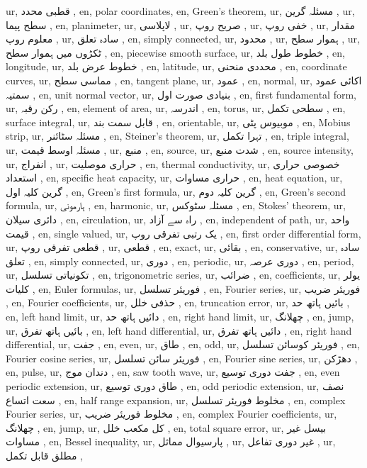 ur, قطبی محدد ,
en, polar coordinates,
en, Green's theorem,
ur, مسئلہ گرین ,
ur, سطح پیما ,
en, planimeter,
ur, لاپلاسی ,
ur, صریح روپ ,
ur, خفی روپ ,
ur, مقدار معلوم روپ ,
ur, سادہ تعلق ,
en, simply connected,
ur, محدود ,
ur, ہموار سطح ,
ur, ٹکڑوں میں ہموار سطح ,
en, piecewise smooth surface,
ur, خطوط طول بلد ,
en, longitude,
ur, خطوط عرض بلد ,
en, latitude,
ur, محددی منحنی ,
en, coordinate curves,
ur, مماسی سطح ,
en, tangent plane,
ur, عمود ,
en, normal,
ur, اکائی عمود سمتیہ ,
en, unit normal vector,
ur, بنیادی صورت اول ,
en, first fundamental form,
ur, رکن رقبہ ,
en, element of area,
ur, اندرسہ ,
en, torus,
ur, سطحی تکمل ,
en, surface integral,
ur, قابل سمت بند ,
en, orientable,
ur, موبیوس پٹی ,
en, Mobius strip,
ur, مسئلہ سٹائنر ,
en, Steiner's theorem,
ur, تہرا تکمل ,
en, triple integral,
ur, مسئلہ اوسط قیمت ,
ur, منبع ,
en, source,
ur, شدت منبع ,
en, source intensity,
ur, انفراج ,
ur, حراری موصلیت ,
en, thermal conductivity,
ur, خصوصی حراری استعداد ,
en, specific heat capacity,
ur, حراری مساوات ,
en, heat equation,
ur, گرین کلیہ اول ,
en, Green's first formula,
ur, گرین کلیہ دوم ,
en, Green's second formula,
ur, ہارمونی ,
en, harmonic,
ur, مسئلہ سٹوکس ,
en, Stokes' theorem,
ur, دائری سیلان ,
en, circulation,
ur, راہ سے آزاد ,
en, independent of path,
ur, واحد قیمت ,
en, single valued,
ur, یک رتبی تفرقی روپ ,
en, first order differential form,
ur, قطعی تفرقی روپ ,
ur, قطعی ,
en, exact,
ur, بقائی ,
en, conservative,
ur, سادہ تعلق ,
en, simply connected,
ur, دوری ,
en, periodic,
ur, دوری عرصہ ,
en, period,
ur, تکونیاتی تسلسل ,
en, trigonometric series,
ur, ضرائب ,
en, coefficients,
ur, یولر کلیات ,
en, Euler formulas,
ur, فوریئر تسلسل ,
en, Fourier series,
ur, فوریئر ضریب  ,
en, Fourier coefficients,
ur, حذفی خلل ,
en, truncation error,
ur, بائیں ہاتھ حد ,
en, left hand limit,
ur, دائیں ہاتھ حد ,
en, right hand limit,
ur, چھلانگ ,
en, jump,
ur, بائیں ہاتھ تفرق ,
en, left hand differential,
ur, دائیں ہاتھ تفرق ,
en, right hand differential,
ur, جفت ,
en, even,
ur, طاق ,
en, odd,
ur, فوریئر کوسائن تسلسل ,
en, Fourier cosine series,
ur, فوریئر سائن تسلسل ,
en, Fourier sine series,
ur, دھڑکن ,
en, pulse,
ur, دندان موج ,
en, saw tooth wave,
ur, جفت دوری توسیع ,
en, even periodic extension,
ur, طاق دوری توسیع ,
en, odd periodic extension,
ur, نصف سعت اتساع ,
en, half range expansion,
ur, مخلوط فوریئر تسلسل ,
en, complex Fourier series,
ur, مخلوط فوریئر ضریب  ,
en, complex Fourier coefficients,
ur, چھلانگ ,
en, jump,
ur, کل مکعب خلل ,
en, total square error,
ur,  بیسل غیر مساوات ,
en, Bessel inequality,
ur, پارسیوال مماثل ,
ur, غیر دوری تفاعل ,
ur, مطلق قابل تکمل ,
